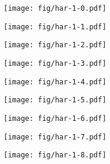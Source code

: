 \documentclass{beamer}
\begin{document}
\begin{frame}
\begin{columns}[t]
\begin{column}{4cm}
  {
    \begin{figure}[h!]
      \centering
      \texttt{[image: fig/har-1-0.pdf]}
    \end{figure}
  }
  {
    \begin{figure}[h!]
      \centering
      \texttt{[image: fig/har-1-1.pdf]}
    \end{figure}
  }
  {
    \begin{figure}[h!]
      \centering
      \texttt{[image: fig/har-1-2.pdf]}
    \end{figure}
  }
  {
    \begin{figure}[h!]
      \centering
      \texttt{[image: fig/har-1-3.pdf]}
    \end{figure}
  }
  {
    \begin{figure}[h!]
      \centering
      \texttt{[image: fig/har-1-4.pdf]}
    \end{figure}
  }
  {
    \begin{figure}[h!]
      \centering
      \texttt{[image: fig/har-1-5.pdf]}
    \end{figure}
  }
  {
    \begin{figure}[h!]
      \centering
      \texttt{[image: fig/har-1-6.pdf]}
    \end{figure}
  }
  {
    \begin{figure}[h!]
      \centering
      \texttt{[image: fig/har-1-7.pdf]}
    \end{figure}
  }
  {
    \begin{figure}[h!]
      \centering
      \texttt{[image: fig/har-1-8.pdf]}
    \end{figure}
  }   
  \end{column}
\end{columns} 
\end{frame}
\end{document}

